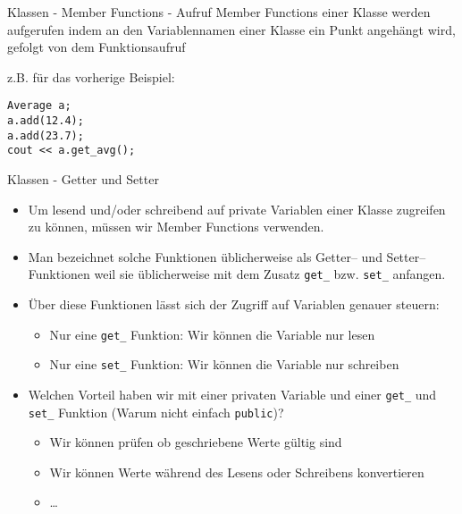 \documentclass[presentation]{beamer}
\begin{document}
\begin{frame}[label={sec:org0ffb84d},fragile]{Klassen - Member Functions - Aufruf}
 Member Functions einer Klasse werden aufgerufen indem \alert{an den Variablennamen einer Klasse ein Punkt angehängt wird, gefolgt von dem
Funktionsaufruf}

z.B. für das vorherige Beispiel:
\begin{verbatim}
Average a;
a.add(12.4);
a.add(23.7);
cout << a.get_avg();
\end{verbatim}
\end{frame}
\begin{frame}[label={sec:orgfe92542},fragile]{Klassen - Getter und Setter}
 \begin{itemize}
\item Um lesend und/oder schreibend auf private Variablen einer Klasse
zugreifen zu können, müssen wir Member Functions verwenden.
\item Man bezeichnet solche Funktionen üblicherweise als \alert{Getter--} und
\alert{Setter--} Funktionen weil sie üblicherweise mit dem Zusatz {\color{solarizedYellow}\verb!get_!}
bzw. {\color{solarizedYellow}\verb!set_!} anfangen.
\item Über diese Funktionen lässt sich der \alert{Zugriff} auf Variablen
\alert{genauer steuern}:
\begin{itemize}
\item Nur eine {\color{solarizedYellow}\verb!get_!} Funktion: Wir können die Variable nur lesen
\item Nur eine {\color{solarizedYellow}\verb!set_!} Funktion: Wir können die Variable nur schreiben
\end{itemize}
\item Welchen Vorteil haben wir mit einer privaten Variable und einer
{\color{solarizedYellow}\verb!get_!} und {\color{solarizedYellow}\verb!set_!} Funktion (Warum nicht einfach {\color{solarizedYellow}\verb!public!})?
\begin{itemize}
\item Wir können prüfen ob geschriebene Werte gültig sind
\item Wir können Werte während des Lesens oder Schreibens konvertieren
\item \ldots{}
\end{itemize}
\end{itemize}
\end{frame}
\end{document}
